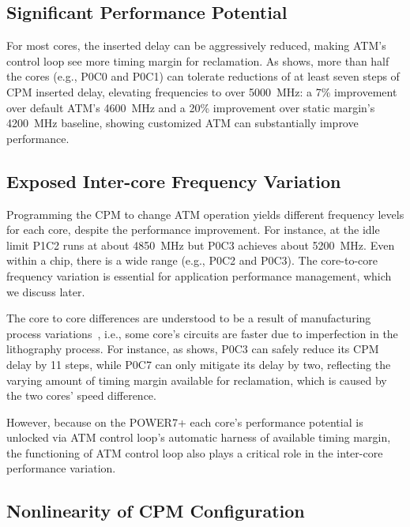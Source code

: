 \subsection{Significant Performance Potential}
\label{sec:process:idle:potential}

For most cores, the inserted delay can be aggressively reduced, making ATM's control loop see more timing margin for reclamation. As  shows, more than half the cores (e.g., P0C0 and P0C1) can tolerate reductions of at least seven steps of CPM inserted delay, elevating frequencies to over 5000~MHz: a 7\% improvement over default ATM's 4600~MHz and a 20\% improvement over static margin's 4200~MHz baseline, showing customized ATM can substantially improve performance.

\subsection{Exposed Inter-core Frequency Variation}
\label{sec:process:idle:heterogeneity}

Programming the CPM to change ATM operation yields different frequency levels for each core, despite the performance improvement. For instance, at the idle limit P1C2 runs at about 4850~MHz but P0C3 achieves about 5200~MHz. Even within a chip, there is a wide range (e.g., P0C2 and P0C3). The core-to-core frequency variation is essential for application performance management, which we discuss later.

The core to core differences are understood to be a result of manufacturing process variations~\cite{dighe2010within,rangan2011achieving}, i.e., some core's circuits are faster due to imperfection in the lithography process. For instance, as  shows, P0C3 can safely reduce its CPM delay by 11 steps, while P0C7 can only mitigate its delay by two, reflecting the varying amount of timing margin available for reclamation, which is caused by the two cores' speed difference.

However, because on the POWER7+ each core's performance potential is unlocked via ATM control loop's automatic harness of available timing margin, the functioning of ATM control loop also plays a critical role in the inter-core performance variation.

\subsection{Nonlinearity of CPM Configuration}
\label{sec:process:idle:cpm_variation}

